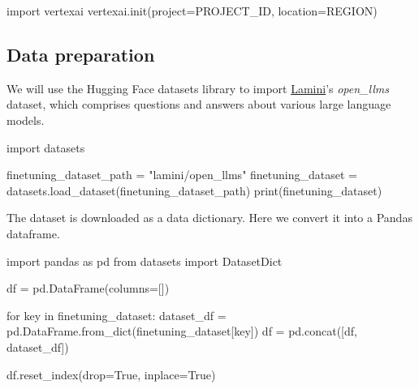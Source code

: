 \documentclass[
  letterpaper,
  DIV=11,
  numbers=noendperiod]{scrreprt}
\newenvironment{Shaded}{\begin{snugshade}}{\end{snugshade}}
\newcommand{\BuiltInTok}[1]{\textcolor[rgb]{0.00,0.23,0.31}{#1}}
\newcommand{\ControlFlowTok}[1]{\textcolor[rgb]{0.00,0.23,0.31}{#1}}
\newcommand{\ImportTok}[1]{\textcolor[rgb]{0.00,0.46,0.62}{#1}}
\newcommand{\KeywordTok}[1]{\textcolor[rgb]{0.00,0.23,0.31}{#1}}
\newcommand{\NormalTok}[1]{\textcolor[rgb]{0.00,0.23,0.31}{#1}}
\newcommand{\OperatorTok}[1]{\textcolor[rgb]{0.37,0.37,0.37}{#1}}
\newcommand{\StringTok}[1]{\textcolor[rgb]{0.13,0.47,0.30}{#1}}
\newcommand{\VariableTok}[1]{\textcolor[rgb]{0.07,0.07,0.07}{#1}}
\begin{document}
\begin{Shaded}
\begin{Highlighting}[]
\ImportTok{import}\NormalTok{ vertexai}
\NormalTok{vertexai.init(project}\OperatorTok{=}\NormalTok{PROJECT\_ID, location}\OperatorTok{=}\NormalTok{REGION)}
\end{Highlighting}
\end{Shaded}

\hypertarget{data-preparation}{%
\subsection{Data preparation}\label{data-preparation}}

We will use the Hugging Face datasets library to import
\href{https://www.lamini.ai/}{Lamini}'s \emph{open\_llms} dataset, which
comprises questions and answers about various large language models.

\begin{Shaded}
\begin{Highlighting}[]
\ImportTok{import}\NormalTok{ datasets}

\NormalTok{finetuning\_dataset\_path }\OperatorTok{=} \StringTok{"lamini/open\_llms"}
\NormalTok{finetuning\_dataset }\OperatorTok{=}\NormalTok{ datasets.load\_dataset(finetuning\_dataset\_path)}
\BuiltInTok{print}\NormalTok{(finetuning\_dataset)}
\end{Highlighting}
\end{Shaded}

The dataset is downloaded as a data dictionary. Here we convert it into
a Pandas dataframe.

\begin{Shaded}
\begin{Highlighting}[]
\ImportTok{import}\NormalTok{ pandas }\ImportTok{as}\NormalTok{ pd}
\ImportTok{from}\NormalTok{ datasets }\ImportTok{import}\NormalTok{ DatasetDict}

\NormalTok{df }\OperatorTok{=}\NormalTok{ pd.DataFrame(columns}\OperatorTok{=}\NormalTok{[])}

\ControlFlowTok{for}\NormalTok{ key }\KeywordTok{in}\NormalTok{ finetuning\_dataset:}
\NormalTok{    dataset\_df }\OperatorTok{=}\NormalTok{ pd.DataFrame.from\_dict(finetuning\_dataset[key])}
\NormalTok{    df }\OperatorTok{=}\NormalTok{ pd.concat([df, dataset\_df])}

\NormalTok{df.reset\_index(drop}\OperatorTok{=}\VariableTok{True}\NormalTok{, inplace}\OperatorTok{=}\VariableTok{True}\NormalTok{)}
\end{Highlighting}
\end{Shaded}
\end{document}
